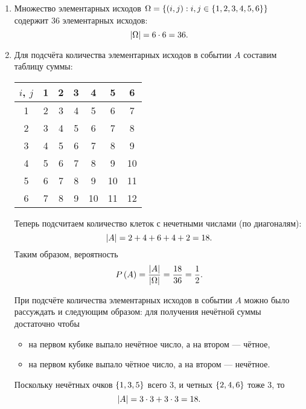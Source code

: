 \begin{enumerate}
    \item
    Множество элементарных исходов $\Omega = \left \{ (i, j): i, j \in \left \{ 1, 2, 3, 4, 5, 6\right \} \right \}$ содержит 36 элементарных исходов:
    \begin{equation}
        \left | \Omega \right | = 6 \cdot 6 = 36.
    \end{equation}

    \item
    Для подсчёта количества элементарных исходов в событии $A$ составим таблицу суммы:
    \begin{center}
        \begin{tabular}{c|c|c|c|c|c|c|}
            $i$, $j$ & 1 & 2 & 3 & 4  & 5  & 6  \\
            \hline
            1        & 2 & 3 & 4 & 5  & 6  & 7  \\
            \hline
            2        & 3 & 4 & 5 & 6  & 7  & 8  \\
            \hline
            3        & 4 & 5 & 6 & 7  & 8  & 9  \\
            \hline
            4        & 5 & 6 & 7 & 8  & 9  & 10 \\
            \hline
            5        & 6 & 7 & 8 & 9  & 10 & 11 \\
            \hline
            6        & 7 & 8 & 9 & 10 & 11 & 12 \\
            \hline
        \end{tabular}
    \end{center}
    Теперь подсчитаем количество клеток с нечетными числами (по диагоналям):
    \begin{equation}
        \left | A \right | = 2 + 4 + 6 + 4 + 2 = 18 .
    \end{equation}
    Таким образом, вероятность
    \begin{equation}
        P \left ( A \right ) = \frac{\left | A \right |}{\left | \Omega \right |} = \frac{18}{36} = \frac{1}{2} .
    \end{equation}

    При подсчёте количества элементарных исходов в событии $A$ можно было рассуждать и следующим образом: для получения нечётной суммы достаточно чтобы
    \begin{itemize}
        \item на первом кубике выпало нечётное число, а на втором --- чётное,
        \item на первом кубике выпало чётное число, а на втором --- нечётное.
    \end{itemize}
    Поскольку нечётных очков $\left \{ 1, 3, 5 \right \}$ всего 3, и четных $\left \{ 2, 4, 6 \right \}$ тоже 3, то
    \begin{equation}
        \left | A \right | = 3 \cdot 3 + 3 \cdot 3 = 18.
    \end{equation}


\end{enumerate}
